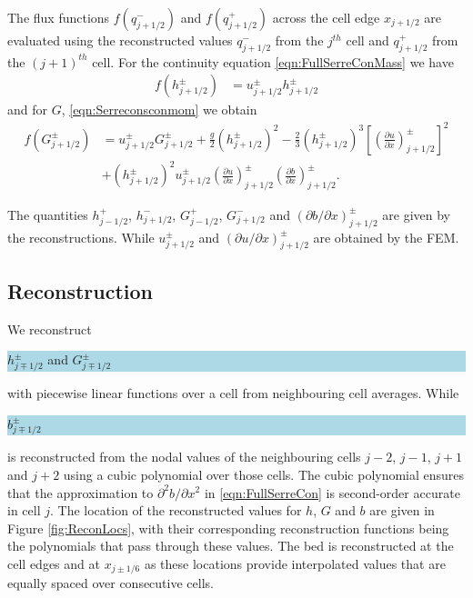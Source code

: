 \documentclass[times]{elsarticle}
\newcommand{\hlb}[1] {\par\colorbox{lightblue}{\parbox{\linewidth}{#1}}}
\newcommand{\hlb}[1] {{#1}}
\begin{document}
The flux functions $f(q^-_{j+1/2})$ and $f(q^+_{j+1/2})$ across the cell edge $x_{j+1/2}$ are evaluated using the reconstructed values $q^-_{j+1/2}$ from the $j^{th}$ cell and $q^+_{j+1/2}$ from the $(j+1)^{th}$ cell. For the continuity equation \eqref{eqn:FullSerreConMass} we have
\begin{align}
f\left(h^\pm_{j+1/2}\right) &= u^\pm_{j + 1/2}  {h}^\pm_{j + 1/2}
\label{eqn:FluxMassNum}
\end{align}
and for $G$, \eqref{eqn:Serreconsconmom} we obtain
\begin{align}
f\left(G^\pm_{j+1/2}\right) &=  u^\pm_{j + 1/2} G^\pm_{j + 1/2}  + \frac{g}{2}\left({h}^\pm_{j + 1/2} \right)^2 - \frac{2}{3}\left({h}^\pm_{j + 1/2}\right)^3 \left[\left(\frac{\partial {u}}{\partial x} \right)^\pm_{j + 1/2} \right]^2 \nonumber\\ &+ \left({h}^\pm_{j + 1/2}\right)^2 u^\pm_{j + 1/2} \left(\frac{\partial {u}}{\partial x} \right)^\pm_{j + 1/2} \left(\frac{\partial b}{\partial x} \right)^\pm_{j + 1/2} .
\label{eqn:FluxIrrotNum}
\end{align}

The quantities ${h}^+_{j - 1/2}$, ${h}^-_{j + 1/2}$, $G^+_{j - 1/2}$, $G^-_{j + 1/2}$ and $ \left({\partial {b}}/{\partial x} \right)^\pm_{j + 1/2}$ are given by the reconstructions. While $u^\pm_{j+1/2}$ and $ \left({\partial {u}}/{\partial x} \right)^\pm_{j + 1/2}$ are obtained by the FEM.

\subsection{Reconstruction}
We reconstruct \hlb{$h^\pm_{j\mp 1/2}$ and $G^\pm_{j\mp 1/2}$} with piecewise linear functions over a cell from neighbouring cell averages. While \hlb{$b^\pm_{j\mp 1/2}$} is reconstructed from the nodal values of the neighbouring cells $j-2$, $j-1$, $j+1$ and $j+2$ using a cubic polynomial over those cells. The cubic polynomial ensures that the approximation to $\partial^2 b / \partial x^2$ in \eqref{eqn:FullSerreCon} is second-order accurate in cell $j$. The location of the reconstructed values for $h$, $G$ and $b$ are given in Figure \ref{fig:ReconLocs}, with their corresponding reconstruction functions being the polynomials that pass through these values. The bed is reconstructed at the cell edges and at $x_{j\pm1/6}$ as these locations provide interpolated values that are equally spaced over consecutive cells.
\end{document}
